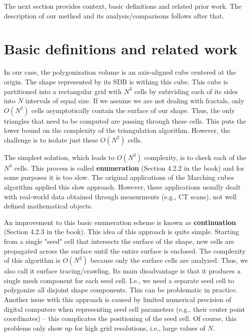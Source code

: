 \documentclass[11pt,twocolumn]{article}
\begin{document}
		The next section provides context, basic definitions and related prior work. The description of our method and its analysis/comparisons follows after that.

	\section{Basic definitions and related work}\label{sec:overview}
        In our case, the polygonization volume is an axis-aligned cube centered at the origin.
		The shape represented by its SDB is withing this cube.
		This cube is partitioned into a rectangular grid with $N^3$ cells by subividing each of its sides into $N$ intervals of equal size.
		If we assume we are not dealing with fractals, only $O(N^2)$ cells asymptotically contain the surface of our shape.
		Thus, the only triangles that need to be computed are passing through these cells.
		This puts the lower bound on the complexity of the triangulation algorithm.
		However, the challenge is to isolate just these $O(N^2)$ cells.

		The simplest solution, which leads to $O(N^3)$ complexity, is to check each of the $N^3$ cells.
		This process is called \textbf{enumeration} \cite{bloomenthal} (Section 4.2.2 in the book) and for some purposes it is too slow.
		The original applications of the Marching cubes algorithm \cite{LorensenCline87marchingcubes} applied this slow approach.
		However, these applications usually dealt with real-world data obtained through measurments (e.g., CT scans), not well defined mathematical objects.

		An improvement to this basic enumeration scheme is known as \textbf{continuation} \cite{bloomenthal} (Section 4.2.3 in the book).
		This idea of this approach is quite simple.
		Starting from a single "seed" cell that intersects the surface of the shape, new cells are propagated across the surface until the entire surface is enclosed.
		The complexity of this algorithm is $O(N^2)$ because only the surface cells are analyzed.
		Thus, we also call it surface tracing/crawling.
		Its main disadvantage is that it produces a single mesh component for each seed cell.
		I.e., we need a separate seed cell to polygonize all disjoint shape components.
		This can be problematic in practice.
		Another issue with this approach is caused by limited numerical precision of digital computers when representing seed cell parameters
		(e.g., their center point coordinates) -- this complicates the positioning of the seed cell.
		Of course, this problems only show up for high grid resolutions, i.e., large values of $N$.
\end{document}
